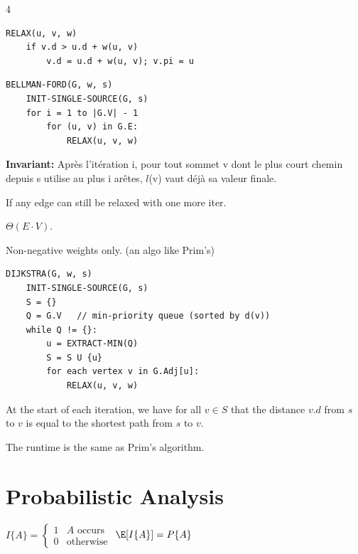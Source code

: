 \documentclass[8pt,a4paper,landscape]{extarticle}
\begin{document}
\begin{multicols*}{4}
\begin{lstlisting}
RELAX(u, v, w)
    if v.d > u.d + w(u, v)
        v.d = u.d + w(u, v); v.pi = u
\end{lstlisting}

\begin{lstlisting}
BELLMAN-FORD(G, w, s)
    INIT-SINGLE-SOURCE(G, s)
    for i = 1 to |G.V| - 1
        for (u, v) in G.E: 
            RELAX(u, v, w)
\end{lstlisting}

\begin{thm}[title=Correctness]
\textbf{Invariant:} Après l'itération i, pour tout sommet v dont le plus court chemin depuis s utilise au plus i arêtes, $l$(v) vaut déjà sa valeur finale.
\end{thm}

\begin{prop}[title=Negative cycle detection]
If any edge can still be relaxed with one more iter.
\end{prop}

\begin{prop}[title=Runtime]
$\Theta(E\cdot V)$.
\end{prop}

Non-negative weights only. (an algo like Prim's)

\begin{lstlisting}
DIJKSTRA(G, w, s)
    INIT-SINGLE-SOURCE(G, s)
    S = {}
    Q = G.V   // min-priority queue (sorted by d(v))
    while Q != {}:
        u = EXTRACT-MIN(Q)
        S = S U {u}
        for each vertex v in G.Adj[u]:
            RELAX(u, v, w)
\end{lstlisting}

\begin{thm}[title=Loop invariant (correctness)]
At the start of each iteration, we have for all $v \in S$ that the distance $v.d$ from $s$ to $v$ is equal to the shortest path from $s$ to $v$.
\end{thm}

\begin{prop}[title=Runtime]
The runtime is the same as Prim's algorithm.
\end{prop}

\section{Probabilistic Analysis}

\begin{defn}[title=Indicator RV]
$I\{A\} = \begin{cases}1 & A\text{ occurs}\\0 & \text{otherwise}\end{cases}$ \quad $\E[I\{A\}] = P\{A\}$
\end{defn}


\end{multicols*}
\end{document}
